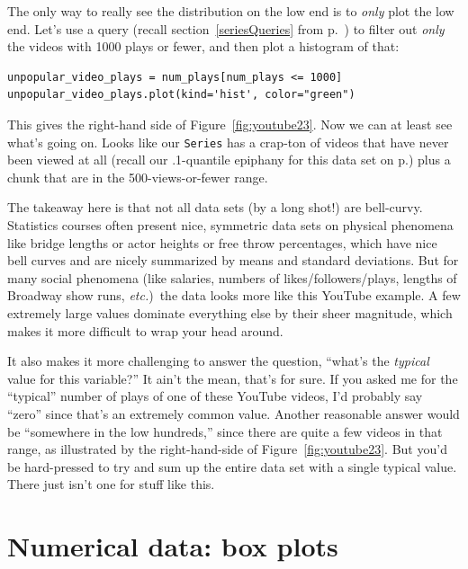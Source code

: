 
The only way to really see the distribution on the low end is to \textit{only}
plot the low end. Let's use a query (recall section~\ref{seriesQueries} from
p.~\pageref{seriesQueries}) to filter out \textit{only} the videos with 1000
plays or fewer, and then plot a histogram of that:

\begin{Verbatim}[fontsize=\footnotesize,samepage=true,frame=single,framesep=3mm]
unpopular_video_plays = num_plays[num_plays <= 1000]
unpopular_video_plays.plot(kind='hist', color="green")
\end{Verbatim}

This gives the right-hand side of Figure~\ref{fig:youtube23}. Now we can at
least see what's going on. Looks like our \texttt{Series} has a crap-ton of
videos that have never been viewed at all (recall our .1-quantile epiphany for
this data set on p.\pageref{pointOneQuantileEpiphany}) plus a chunk that are in
the 500-views-or-fewer range.


The takeaway here is that not all data sets (by a long shot!) are bell-curvy.
Statistics courses often present nice, symmetric data sets on physical
phenomena like bridge lengths or actor heights or free throw percentages, which
have nice bell curves and are nicely summarized by means and standard
deviations. But for many social phenomena (like salaries, numbers of
likes/followers/plays, lengths of Broadway show runs, \textit{etc.})~the data
looks more like this YouTube example. A few extremely large values dominate
everything else by their sheer magnitude, which makes it more difficult to wrap
your head around.

It also makes it more challenging to answer the question, ``what's the
\textit{typical} value for this variable?'' It ain't the mean, that's for sure.
If you asked me for the ``typical'' number of plays of one of these YouTube
videos, I'd probably say ``zero'' since that's an extremely common value.
Another reasonable answer would be ``somewhere in the low hundreds,'' since
there are quite a few videos in that range, as illustrated by the
right-hand-side of Figure~\ref{fig:youtube23}. But you'd be hard-pressed to try
and sum up the entire data set with a single typical value. There just isn't
one for stuff like this.

\section{Numerical data: box plots}

